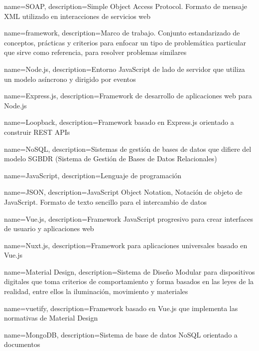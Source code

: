 {
    name=SOAP,
    description={Simple Object Access Protocol. Formato de mensaje XML utilizado en interacciones de servicios web}
}

{
    name=framework,
    description={Marco de trabajo. Conjunto estandarizado de conceptos, prácticas y criterios para enfocar un tipo de problemática particular que sirve como referencia, para resolver problemas similares}
}

{
    name=Node.js,
    description={Entorno JavaScript de lado de servidor que utiliza un modelo asíncrono y dirigido por eventos}
}

{
    name=Express.js,
    description={Framework de desarrollo de aplicaciones web para Node.js}
}

{
    name=Loopback,
    description={Framework basado en Express.js orientado a construir REST APIs}
}

{
    name=NoSQL,
    description={Sistemas de gestión de bases de datos que difiere del modelo SGBDR (Sistema de Gestión de Bases de Datos Relacionales)}
}

{
    name=JavaScript,
    description={Lenguaje de programación}
}


{
    name=JSON,
    description={JavaScript Object Notation, Notación de objeto de JavaScript. Formato de texto sencillo para el intercambio de datos}
}

{
    name=Vue.js,
    description={Framework JavaScript progresivo para crear interfaces de usuario y aplicaciones web}
}

{
    name=Nuxt.js,
    description={Framework para aplicaciones universales basado en  Vue.js}
}

{
    name=Material Design,
    description={Sistema de Diseño Modular para dispositivos digitales que toma criterios de comportamiento y forma basados en las leyes de la realidad, entre ellos la iluminación, movimiento y materiales}
}

{
    name=vuetify,
    description={Framework basado en Vue.js que implementa las normativas de Material Design}
}

{
    name=MongoDB,
    description={Sistema de base de datos NoSQL orientado a documentos}
}


